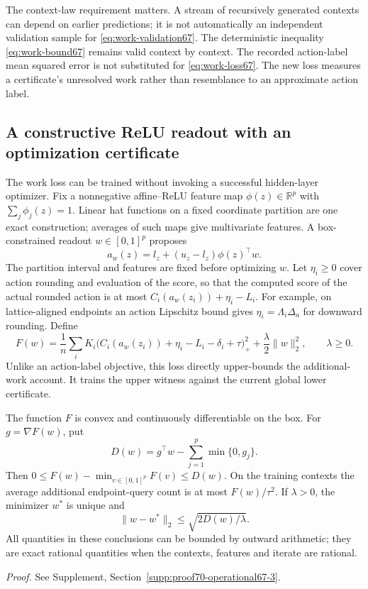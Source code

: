 The context-law requirement matters. A stream of recursively generated contexts can depend on earlier predictions; it is not automatically an independent validation sample for \eqref{eq:work-validation67}. The deterministic inequality \eqref{eq:work-bound67} remains valid context by context. The recorded action-label mean squared error is not substituted for \eqref{eq:work-loss67}. The new loss measures a certificate's unresolved work rather than resemblance to an approximate action label.

\subsection{A constructive ReLU readout with an optimization certificate}
The work loss can be trained without invoking a successful hidden-layer optimizer. Fix a nonnegative affine--ReLU feature map $\phi(z)\in\mathbb R^p$ with $\sum_j\phi_j(z)=1$. Linear hat functions on a fixed coordinate partition are one exact construction; averages of such maps give multivariate features. A box-constrained readout $w\in[0,1]^p$ proposes
\[
 a_w(z)=l_z+(u_z-l_z)\phi(z)^\top w.
\]
The partition interval and features are fixed before optimizing $w$. Let $\eta_i\ge0$ cover action rounding and evaluation of the score, so that the computed score of the actual rounded action is at most $C_i(a_w(z_i))+\eta_i-L_i$. For example, on lattice-aligned endpoints an action Lipschitz bound gives $\eta_i=\Lambda_i\Delta_a$ for downward rounding. Define
\begin{equation}\label{eq:readout-loss67}
 F(w)=\frac1n\sum_i K_i
 \bigl(C_i(a_w(z_i))+\eta_i-L_i-\delta_i+\tau\bigr)_+^2
                      +\frac\lambda2\|w\|_2^2,
 \qquad \lambda\ge0.
\end{equation}
Unlike an action-label objective, this loss directly upper-bounds the additional-work account. It trains the upper witness against the current global lower certificate.

\begin{proposition}\label{prop:readout67}
The function $F$ is convex and continuously differentiable on the box. For $g=\nabla F(w)$, put
\begin{equation}\label{eq:dual-gap67}
 D(w)=g^\top w-\sum_{j=1}^p\min\{0,g_j\}.
\end{equation}
Then $0\le F(w)-\min_{v\in[0,1]^p}F(v)\le D(w)$. On the training contexts the average additional endpoint-query count is at most $F(w)/\tau^2$. If $\lambda>0$, the minimizer $w^*$ is unique and
\[
 \|w-w^*\|_2\le\sqrt{2D(w)/\lambda}.
\]
All quantities in these conclusions can be bounded by outward arithmetic; they are exact rational quantities when the contexts, features and iterate are rational.
\end{proposition}
\noindent\emph{Proof.} See Supplement, Section~\ref{supp:proof70-operational67-3}.


